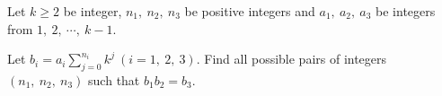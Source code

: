 Let $ k\geq 2$ be  integer, $ n_1,\ n_2,\ n_3$ be positive integers and $ a_1,\ a_2,\ a_3$ be integers from $ 1,\ 2,\ \cdots ,\ k - 1$.

Let $ b_i = a_i\sum_{j = 0}^{n_i} k^{j}\ (i = 1,\ 2,\ 3)$. Find all possible pairs of integers $ (n_1,\ n_2,\ n_3)$ such that $ b_1b_2 = b_3$.
